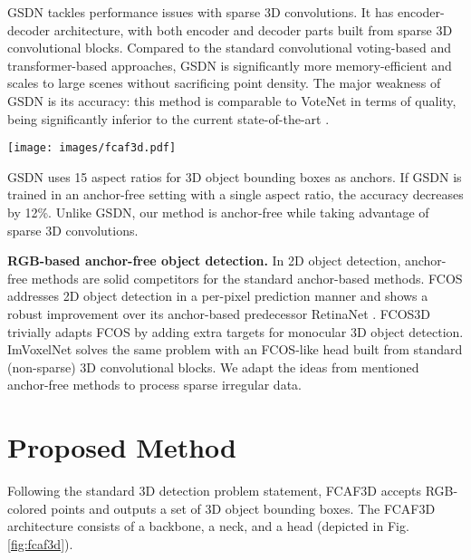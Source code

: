 \documentclass[runningheads]{llncs}
\begin{document}
GSDN \cite{gwak2020gsdn} tackles performance issues with sparse 3D convolutions. It has encoder-decoder architecture, with both encoder and decoder parts built from sparse 3D convolutional blocks. Compared to the standard convolutional voting-based and transformer-based approaches, GSDN is significantly more memory-efficient and scales to large scenes without sacrificing point density. The major weakness of GSDN is its accuracy: this method is comparable to VoteNet in terms of quality, being significantly inferior to the current state-of-the-art \cite{liu2021group-free}.

\begin{figure*}[ht!]
    \centering
        \texttt{[image: images/fcaf3d.pdf]}
    \caption{The general scheme of the proposed FCAF3D. All convolutions and transposed convolutions are three-dimensional and sparse. This design allows processing the input point cloud in a single forward pass.}
    \label{fig:fcaf3d}
\end{figure*}

GSDN uses 15 aspect ratios for 3D object bounding boxes as anchors. If GSDN is trained in an anchor-free setting with a single aspect ratio, the accuracy decreases by 12\%. Unlike GSDN, our method is anchor-free while taking advantage of sparse 3D convolutions.

\textbf{RGB-based anchor-free object detection.} In 2D object detection, anchor-free methods are solid competitors for the standard anchor-based methods. FCOS \cite{tian2019fcos} addresses 2D object detection in a per-pixel prediction manner and shows a robust improvement over its anchor-based predecessor RetinaNet \cite{lin2017retinanet}. FCOS3D \cite{wang2021fcos3d} trivially adapts FCOS by adding extra targets for monocular 3D object detection. ImVoxelNet \cite{rukhovich2021imvoxelnet} solves the same problem with an FCOS-like head built from standard (non-sparse) 3D convolutional blocks. We adapt the ideas from mentioned anchor-free methods to process sparse irregular data.

\section{Proposed Method}

Following the standard 3D detection problem statement, FCAF3D accepts  RGB-colored points and outputs a set of 3D object bounding boxes. The FCAF3D architecture consists of a backbone, a neck, and a head (depicted in Fig. \ref{fig:fcaf3d}).
\end{document}
